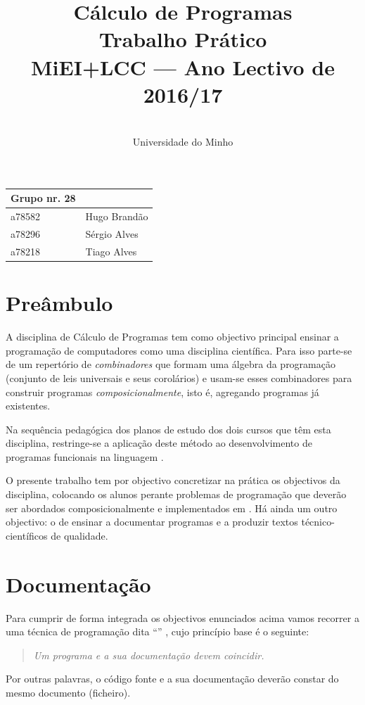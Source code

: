\documentclass[a4paper]{article}
\title{
       	Cálculo de Programas
\\
       	Trabalho Prático
\\
       	MiEI+LCC --- Ano Lectivo de 2016/17
}
\author{
       	\dium
\\
       	Universidade do Minho
}
\date\mydate
\begin{document}
\maketitle

\begin{center}\large
\begin{tabular}{ll}
\textbf{Grupo} nr. 28
\\
\hline
a78582 & Hugo Brandão
\\
a78296 & Sérgio Alves
\\
a78218 & Tiago Alves
\end{tabular}
\end{center}

\tableofcontents

\newpage

\section{Preâmbulo}

A disciplina de Cálculo de Programas tem como objectivo principal ensinar
a progra\-mação de computadores como uma disciplina científica. Para isso
parte-se de um repertório de \emph{combinadores} que formam uma álgebra da
programação (conjunto de leis universais e seus corolários) e usam-se esses
combinadores para construir programas \emph{composicionalmente}, isto é,
agregando programas já existentes.

Na sequência pedagógica dos planos de estudo dos dois cursos que têm esta
disciplina, restringe-se a aplicação deste método ao desenvolvimento de programas
funcionais na linguagem \Haskell.

O presente trabalho tem por objectivo concretizar na prática os objectivos
da disciplina, colocando os alunos perante problemas de programação que
deverão ser abordados composicionalmente e implementados em \Haskell.
Há ainda um outro objectivo: o de ensinar a documentar programas e
a produzir textos técnico-científicos de qualidade.

\section{Documentação}
Para cumprir de forma integrada os objectivos enunciados acima vamos recorrer
a uma técnica de programa\-ção dita ``'' \cite{Kn92}, cujo
princípio base é o seguinte:
\begin{quote}\em
Um programa e a sua documentação devem coincidir.
\end{quote}
Por outras palavras, o código fonte e a sua documentação deverão constar
do mesmo documento (ficheiro).
\end{document}

